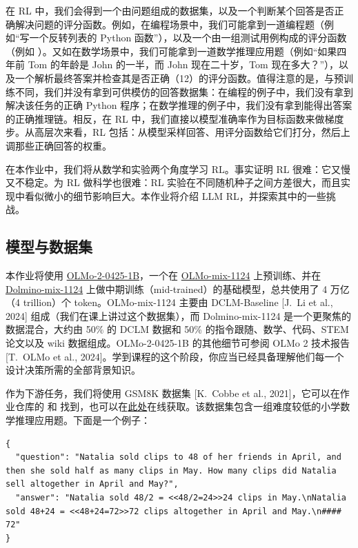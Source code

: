 在 RL 中，我们会得到一个由问题组成的数据集，以及一个判断某个回答是否正确解决问题的评分函数。例如，在编程场景中，我们可能拿到一道编程题（例如“写一个反转列表的 Python 函数”），以及一个由一组测试用例构成的评分函数（例如 ）。又如在数学场景中，我们可能拿到一道数学推理应用题（例如“如果四年前 Tom 的年龄是 John 的一半，而 John 现在二十岁，Tom 现在多大？”），以及一个解析最终答案并检查其是否正确（12）的评分函数。值得注意的是，与预训练不同，我们并没有拿到可供模仿的回答数据集：在编程的例子中，我们没有拿到解决该任务的正确 Python 程序；在数学推理的例子中，我们没有拿到能得出答案的正确推理链。相反，在 RL 中，我们直接以模型准确率作为目标函数来做梯度步。从高层次来看，RL 包括：从模型采样回答、用评分函数给它们打分，然后上调那些正确回答的权重。

在本作业中，我们将从数学和实验两个角度学习 RL。事实证明 RL 很难：它又慢又不稳定。为 RL 做科学也很难：RL 实验在不同随机种子之间方差很大，而且实现中看似微小的细节影响巨大。本作业将介绍 LLM RL，并探索其中的一些挑战。

\subsection{模型与数据集}

本作业将使用 \href{https://huggingface.co/allenai/OLMo-2-0425-1B}{OLMo-2-0425-1B}，一个在 \href{https://huggingface.co/datasets/allenai/olmo-mix-1124}{OLMo-mix-1124} 上预训练、并在 \href{https://huggingface.co/datasets/allenai/dolmino-mix-1124}{Dolmino-mix-1124} 上做中期训练（mid-trained）的基础模型，总共使用了 4 万亿（4 trillion）个 token。OLMo-mix-1124 主要由 DCLM-Baseline [J.\ Li et al., 2024] 组成（我们在课上讲过这个数据集），而 Dolmino-mix-1124 是一个更聚焦的数据混合，大约由 50\% 的 DCLM 数据和 50\% 的指令跟随、数学、代码、STEM 论文以及 wiki 数据组成。OLMo-2-0425-1B 的其他细节可参阅 OLMo 2 技术报告 [T.\ OLMo et al., 2024]。学到课程的这个阶段，你应当已经具备理解他们每一个设计决策所需的全部背景知识。

作为下游任务，我们将使用 GSM8K 数据集 [K.\ Cobbe et al., 2021]，它可以在作业仓库的  和  找到，也可以在\href{https://huggingface.co/datasets/openai/gsm8k}{此处}在线获取。该数据集包含一组难度较低的小学数学推理应用题。下面是一个例子：

\begin{lstlisting}
{
  "question": "Natalia sold clips to 48 of her friends in April, and then she sold half as many clips in May. How many clips did Natalia sell altogether in April and May?",
  "answer": "Natalia sold 48/2 = <<48/2=24>>24 clips in May.\nNatalia sold 48+24 = <<48+24=72>>72 clips altogether in April and May.\n#### 72"
}
\end{lstlisting}

